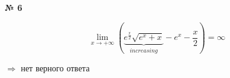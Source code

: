 \documentclass{article}
\begin{document}
\textbf{№ 6} 

$$ \lim\limits_{x \to +\infty} \left( \underbrace{e^{\frac{x}{2}} \sqrt{e^x+x}}_{increasing} - e^x - \frac{x}{2} \right)
= \infty $$

$\Rightarrow$ нет верного ответа
\end{document}
